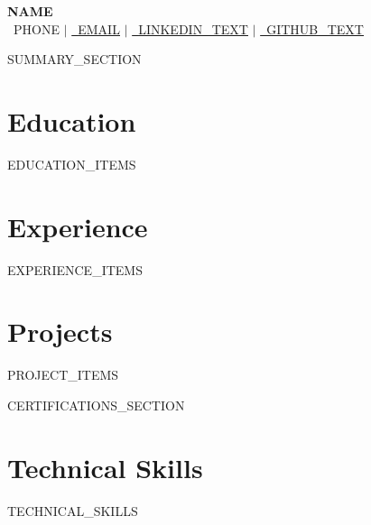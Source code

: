 \documentclass[letterpaper,12pt]{article}
\newcommand{\resumeSubHeadingListStart}{\begin{itemize}[leftmargin=0.15in, label={}]}
\newcommand{\resumeSubHeadingListEnd}{\end{itemize}}
\begin{document}
\begin{center}
    \textbf{\Huge \scshape {{NAME}}} \\ \vspace{1pt}
    \small
    \faPhone* \ {{PHONE}} $|$
    \href{mailto:{{EMAIL}}}{\faEnvelope \ \underline{{{EMAIL}}}} $|$
    \href{{{LINKEDIN_HREF}}}{\faLinkedin \ \underline{{{LINKEDIN_TEXT}}}} $|$
    \href{{{GITHUB_HREF}}}{\faGithub \ \underline{{{GITHUB_TEXT}}}}
\end{center}


{{SUMMARY_SECTION}}

\section{Education}
  \resumeSubHeadingListStart
{{EDUCATION_ITEMS}}
  \resumeSubHeadingListEnd


\section{Experience}
  \resumeSubHeadingListStart
{{EXPERIENCE_ITEMS}}
  \resumeSubHeadingListEnd


\section{Projects}
    \resumeSubHeadingListStart
{{PROJECT_ITEMS}}
    \resumeSubHeadingListEnd


{{CERTIFICATIONS_SECTION}}


\section{Technical Skills}
 \begin{itemize}[leftmargin=0.15in, label={}]
    \small{\item{
{{TECHNICAL_SKILLS}}
    }}
 \end{itemize}


\end{document}
